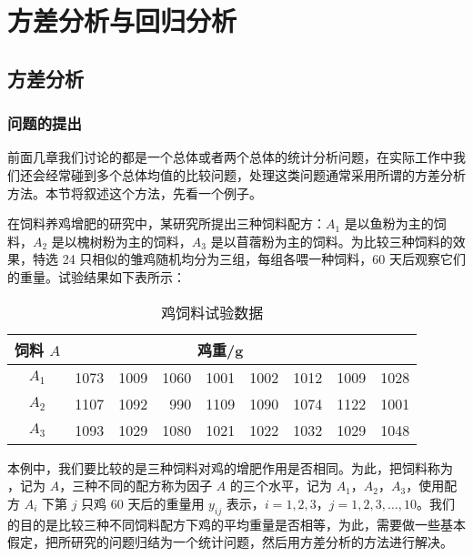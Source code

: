 \chapter{方差分析与回归分析\label{cha:8}}

\section{方差分析\label{sec:8.1}}
\subsection{问题的提出}
前面几章我们讨论的都是一个总体或者两个总体的统计分析问题，在实际工作中我们还会经常碰到多个总体均值的比较问题，处理这类问题通常采用所谓的方差分析方法。本节将叙述这个方法，先看一个例子。

\begin{example}\label{exam:8.1.1}
在饲料养鸡增肥的研究中，某研究所提出三种饲料配方：$A_1$ 是以鱼粉为主的饲料，$A_2$ 是以槐树粉为主的饲料，$A_3$ 是以苜蓿粉为主的饲料。为比较三种饲料的效果，特选 24 只相似的雏鸡随机均分为三组，每组各喂一种饲料，60 天后观察它们的重量。试验结果如下表所示：

\begin{table}[htbp]
  \centering
  \caption{鸡饲料试验数据}
    \begin{tabular}{c|rrrrrrrr}
    \toprule
    饲料 $A$   & \multicolumn{7}{c}{鸡重/\si{\gram}                     } &      \\
    \midrule
    $A_1$  & 1073  & 1009  & 1060  & 1001  & 1002  & 1012  & 1009  & 1028 \\
    $A_2$  & 1107  & 1092  & 990   & 1109  & 1090  & 1074  & 1122  & 1001 \\
    $A_3$  & 1093  & 1029  & 1080  & 1021  & 1022  & 1032  & 1029  & 1048 \\
    \bottomrule
    \end{tabular}%
  \label{tab:8.1.1}%
\end{table}%
\end{example}

本例中，我们要比较的是三种饲料对鸡的增肥作用是否相同。为此，把饲料称为 ，记为 $A$，三种不同的配方称为因子 $A$ 的三个水平，记为 $A_1$，$A_2$，$A_3$，使用配方 $A_i$ 下第 $j$ 只鸡 60 天后的重量用 $y_{ij}$ 表示，$i = 1,2,3$，$j =1,2,3,\ldots,10$。我们的目的是比较三种不同饲料配方下鸡的平均重量是否相等，为此，需要做一些基本假定，把所研究的问题归结为一个统计问题，然后用方差分析的方法进行解决。

